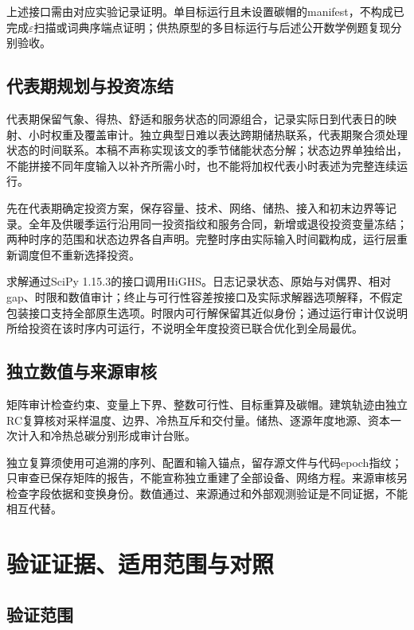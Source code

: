 上述接口需由对应实验记录证明。单目标运行且未设置碳帽的manifest，不构成已完成$\varepsilon$扫描或词典序端点证明；供热原型的多目标运行与后述公开数学例题复现分别验收。

\subsection{代表期规划与投资冻结}

代表期保留气象、得热、舒适和服务状态的同源组合，记录实际日到代表日的映射、小时权重及覆盖审计。独立典型日难以表达跨期储热联系，代表期聚合须处理状态的时间联系。本稿不声称实现该文的季节储能状态分解；状态边界单独给出，不能拼接不同年度输入以补齐所需小时，也不能将加权代表小时表述为完整连续运行。

先在代表期确定投资方案，保存容量、技术、网络、储热、接入和初末边界等记录。全年及供暖季运行沿用同一投资指纹和服务合同，新增或退役投资变量冻结；两种时序的范围和状态边界各自声明。完整时序由实际输入时间戳构成，运行层重新调度但不重新选择投资。

求解通过SciPy 1.15.3的接口调用HiGHS。日志记录状态、原始与对偶界、相对gap、时限和数值审计；终止与可行性容差按接口及实际求解器选项解释，不假定包装接口支持全部原生选项。时限内可行解保留其近似身份；通过运行审计仅说明所给投资在该时序内可运行，不说明全年度投资已联合优化到全局最优。

\subsection{独立数值与来源审核}

矩阵审计检查约束、变量上下界、整数可行性、目标重算及碳帽。建筑轨迹由独立RC复算核对采样温度、边界、冷热互斥和交付量。储热、逐源年度地源、资本一次计入和冷热总碳分别形成审计台账。

独立复算须使用可追溯的序列、配置和输入锚点，留存源文件与代码epoch指纹；只审查已保存矩阵的报告，不能宣称独立重建了全部设备、网络方程。来源审核另检查字段依据和变换身份。数值通过、来源通过和外部观测验证是不同证据，不能相互代替。

\clearpage
\section{验证证据、适用范围与对照}

\subsection{验证范围}

